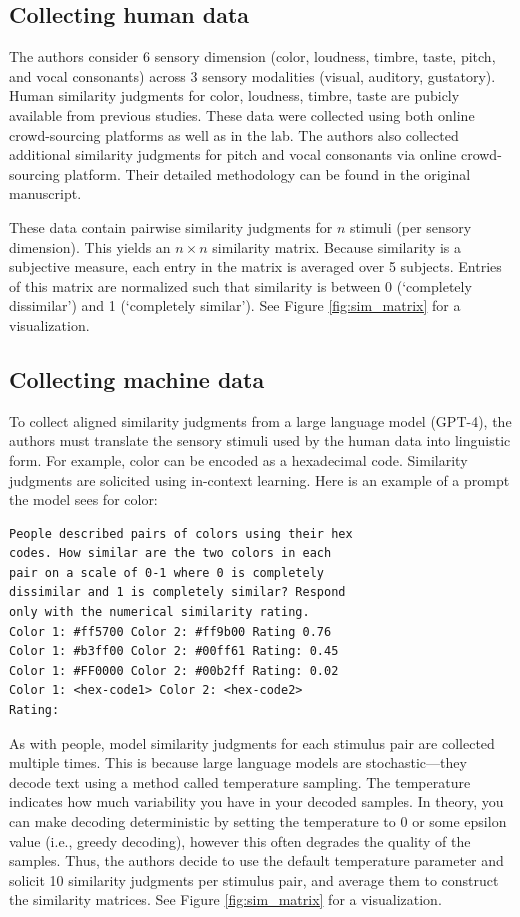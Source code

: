 \documentclass[man]{apa7}
\begin{document}
\subsection{Collecting human data}

The authors consider 6 sensory dimension (color, loudness, timbre, taste, pitch, and vocal consonants) across 3 sensory modalities (visual, auditory, gustatory). Human similarity judgments for color, loudness, timbre, taste are pubicly available from previous studies. These data were collected using both online crowd-sourcing platforms as well as in the lab. The authors also collected additional similarity judgments for pitch and vocal consonants via online crowd-sourcing platform. Their detailed methodology can be found in the original manuscript.

These data contain pairwise similarity judgments for $n$ stimuli (per sensory dimension). This yields an $n\times n$ similarity matrix. Because similarity is a subjective measure, each entry in the matrix is averaged over 5 subjects. Entries of this matrix are normalized such that similarity is between 0 (`completely dissimilar') and 1 (`completely similar'). See Figure \ref{fig:sim_matrix} for a visualization.

\subsection{Collecting machine data}

To collect aligned similarity judgments from a large language model (GPT-4), the authors must translate the sensory stimuli used by the human data into linguistic form. For example, color can be encoded as a hexadecimal code. Similarity judgments are solicited using in-context learning. Here is an example of a prompt the model sees for color:

\begin{verbatim}
People described pairs of colors using their hex
codes. How similar are the two colors in each
pair on a scale of 0-1 where 0 is completely
dissimilar and 1 is completely similar? Respond
only with the numerical similarity rating.
Color 1: #ff5700 Color 2: #ff9b00 Rating 0.76
Color 1: #b3ff00 Color 2: #00ff61 Rating: 0.45
Color 1: #FF0000 Color 2: #00b2ff Rating: 0.02
Color 1: <hex-code1> Color 2: <hex-code2>
Rating:
\end{verbatim}

As with people, model similarity judgments for each stimulus pair are collected multiple times. This is because large language models are stochastic---they decode text using a method called temperature sampling. The temperature indicates how much variability you have in your decoded samples. In theory, you can make decoding deterministic by setting the temperature to 0 or some epsilon value (i.e., greedy decoding), however this often degrades the quality of the samples. Thus, the authors decide to use the default temperature parameter and solicit 10 similarity judgments per stimulus pair, and average them to construct the similarity matrices. See Figure \ref{fig:sim_matrix} for a visualization.
\end{document}
